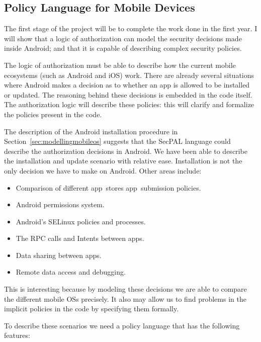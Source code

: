 \documentclass[a4paper]{article}
\begin{document}
\subsection{Policy Language for Mobile Devices}
\label{sec:proposallang}

The first stage of the project will be to complete the work done in the first
year. I will show that a logic of authorization can model the security decisions
made inside Android; and that it is capable of describing complex security
policies. 

The logic of authorization must be able to describe how the current mobile
ecosystems (such as Android and iOS) work.  There are already several situations
where Android makes a decision as to whether an app is allowed to be installed
or updated.  The reasoning behind these decisions is embedded in the code
itself.  The authorization logic will describe these policies: this
will clarify and formalize the policies present in the code.

The description of the Android installation procedure in
Section~\ref{sec:modellingmobileos} suggests that the SecPAL language could
describe the authorization decisions in Android. We have been able to describe
the installation and update scenario with relative ease.  Installation is not
the only decision we have to make on Android. Other areas include:

\begin{itemize}
  \item Comparison of different app~stores app~submission policies.
  \item Android permissions system.
  \item Android's SELinux policies and processes.
  \item The \ac{RPC} calls and Intents between apps.
  \item Data sharing between apps.
  \item Remote data access and debugging.
\end{itemize}

This is interesting because by modeling these decisions we are able to
compare the different mobile OSs precisely.  It also may allow us to find
problems in the implicit policies in the code by specifying them formally.

To describe these scenarios we need a policy language that has the following
features:
\end{document}
